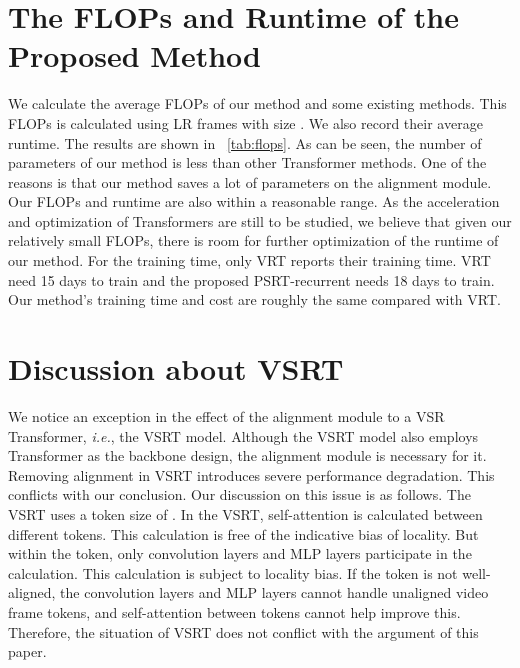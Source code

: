 \documentclass{article}
\newcommand{\ie}{\emph{i.e.}}    \newcommand{\eg}{\emph{e.g.}}    \newcommand{\vs}{\emph{v.s.}}    \newcommand{\etc}{\emph{etc}}     \newcommand{\wo}{\emph{w/o}}     \newcommand{\wi}{\emph{w/}}      \newcommand{\wrt}{\emph{w.r.t.}} \def\etal{\emph{et al.}}
\begin{document}
\vspace{-3mm}
\section{The FLOPs and Runtime of the Proposed Method}
\vspace{-2mm}
We calculate the average FLOPs of our method and some existing methods.
This FLOPs is calculated using LR frames with size .
We also record their average runtime.
The results are shown in \tablename~\ref{tab:flops}.
As can be seen, the number of parameters of our method is less than other Transformer methods.
One of the reasons is that our method saves a lot of parameters on the alignment module.
Our FLOPs and runtime are also within a reasonable range.
As the acceleration and optimization of Transformers are still to be studied, we believe that given our relatively small FLOPs, there is room for further optimization of the runtime of our method.
For the training time, only VRT reports their training time.
VRT need 15 days to train and the proposed PSRT-recurrent needs 18 days to train.
Our method's training time and cost are roughly the same compared with VRT.


\vspace{-3mm}
\section{Discussion about VSRT}
\vspace{-2mm}
We notice an exception in the effect of the alignment module to a VSR Transformer, \ie, the VSRT model.
Although the VSRT model \cite{cao2021video} also employs Transformer as the backbone design, the alignment module is necessary for it.
Removing alignment in VSRT introduces severe performance degradation.
This conflicts with our conclusion.
Our discussion on this issue is as follows.
The VSRT uses a token size of .
In the VSRT, self-attention is calculated between different tokens.
This calculation is free of the indicative bias of locality.
But within the  token, only convolution layers and MLP layers participate in the calculation.
This calculation is subject to locality bias.
If the  token is not well-aligned, the convolution layers and MLP layers cannot handle unaligned video frame tokens, and self-attention between tokens cannot help improve this.
Therefore, the situation of VSRT does not conflict with the argument of this paper.


\vspace{-3mm}
\end{document}
